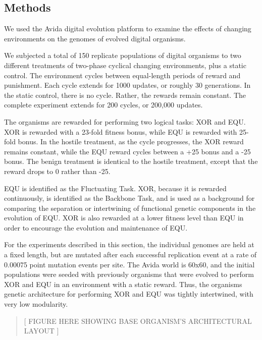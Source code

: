 \subsection{Methods}

We used the Avida digital evolution platform to examine the effects of changing environments on the genomes of evolved digital organisms.

We subjected a total of 150 replicate populations of digital organisms to two different treatments of two-phase cyclical changing environments, plus a static control. The environment cycles between equal-length periods of reward and punishment. Each cycle extends for 1000 updates, or roughly 30 generations. In the static control, there is no cycle. Rather, the rewards remain constant. The complete experiment extends for 200 cycles, or 200,000 updates.

The organisms are rewarded for performing two logical tasks: XOR and EQU. XOR is rewarded with a 23-fold fitness bonus, while EQU is rewarded with 25-fold bonus. In the hostile treatment, as the cycle progresses, the XOR reward remains constant, while the EQU reward cycles between a +25 bonus and a -25 bonus. The benign treatment is identical to the hostile treatment, except that the reward drops to 0 rather than -25.

EQU is identified as the Fluctuating Task. XOR, because it is rewarded continuously, is identified as the Backbone Task, and is used as a background for comparing the separation or intertwining of functional genetic components in the evolution of EQU. XOR is also rewarded at a lower fitness level than EQU in order to encourage the evolution and maintenance of EQU.

For the experiments described in this section, the individual genomes are held at a fixed length, but are mutated after each successful replication event at a rate of 0.00075 point mutation events per site. The Avida world is 60x60, and the initial populations were seeded with previously organisms that were evolved to perform XOR and EQU in an environment with a static reward. Thus, the organisms genetic architecture for performing XOR and EQU was tightly intertwined, with very low modularity.

\begin{quote}
[ FIGURE HERE SHOWING BASE ORGANISM’S ARCHITECTURAL LAYOUT ]
\end{quote}